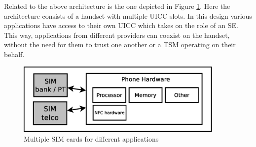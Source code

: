 \begin{enumerate}
\begin{item}
Related to the above architecture is the one depicted in Figure \ref{fig:multi_sim}.
Here the architecture consists of a handset with multiple UICC slots.
In this design various applications have access to their own UICC which takes on the role of an SE.
This way, applications from different providers can coexist on the handset, without the need for them to trust one another or a TSM operating on their behalf. %
\begin{figure}
\includegraphics[width=0.9\textwidth]{images/meerdere_sims}
\caption[Multiple SIM cards]
{
Multiple SIM cards for different applications
}
\label{fig:multi_sim}
\end{figure}
\end{item}


\end{enumerate}
